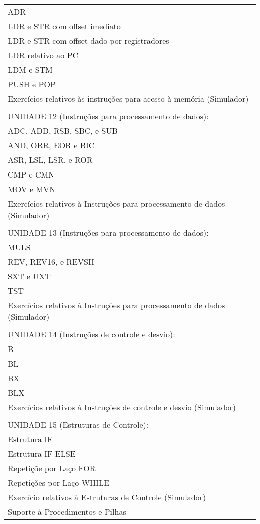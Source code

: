 \documentclass[12pt]{article}
\begin{document}
\begin{longtable}{|L{1.025\textwidth}|}
      ADR\\
      LDR e STR com offset imediato\\ 
      LDR e STR com offset dado por registradores\\ 
      LDR relativo ao PC \\
      LDM e STM \\
      PUSH e POP \\
      Exercícios relativos às instruções para acesso à memória (Simulador)\\
      \\
UNIDADE 12 (Instruções para processamento de dados):\\
      ADC, ADD, RSB, SBC, e SUB \\
      AND, ORR, EOR e BIC \\
      ASR, LSL, LSR, e ROR \\
      CMP e CMN \\
      MOV e MVN \\
      Exercícios relativos à  Instruções para processamento de dados (Simulador)\\
\\
UNIDADE 13 (Instruções para processamento de dados):\\
      MULS\\
      REV, REV16, e REVSH\\
      SXT e UXT \\
      TST\\
      Exercícios relativos à  Instruções para processamento de dados (Simulador)\\
      \\
UNIDADE 14 (Instruções de controle e desvio):\\
      B\\
      BL\\
      BX\\
      BLX \\
      Exercícios relativos à Instruções de controle e desvio (Simulador)\\
\\
UNIDADE 15 (Estruturas de Controle):\\
      Estrutura IF \\
      Estrutura IF ELSE\\ 
      Repetiçõe por Laço FOR\\ 
      Repetições por Laço WHILE\\
      Exercício relativos à  Estruturas de Controle (Simulador)\\
      Suporte à Procedimentos e Pilhas\\

\end{longtable}
\end{document}

